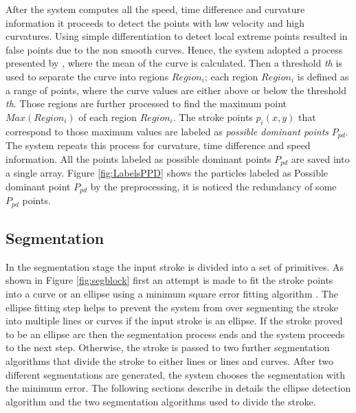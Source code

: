 \documentclass[10pt]{article}
\begin{document}
After the system computes all the speed, time difference and curvature information it proceeds to detect the points with low velocity and high curvatures. Using simple differentiation to detect local extreme points resulted in false points due to the non smooth curves. Hence, the system adopted a process presented by \cite{earlyprocess}, where the mean of the curve is calculated. Then a threshold \textit{th} is used to separate the curve into regions $Region_i$; each region $Region_i$ is defined as a range of points, where the curve values are either above or below the threshold \textit{th}. Those regions are further processed to find the maximum point $Max(Region_i)$ of each region $Region_i$. The stroke points $p_i(x,y)$ that correspond to those maximum values are labeled as \textit{possible dominant points} $P_{pd}$. The system repeats this process for curvature, time difference and speed information. All the points labeled as possible dominant points $P_{pd}$ are saved into a single array. Figure \ref{fig:LabelsPPD} shows the particles labeled as Possible dominant point $P_{pd}$ by the preprocessing, it is noticed the redundancy of some $P_{pd}$ points. %
\subsection{Segmentation}
\label{seg}
In the segmentation stage the input stroke is divided into a set of primitives. As shown in Figure \ref{fig:segblock} first an attempt is made to fit the stroke points into a curve or an ellipse using a minimum square error fitting algorithm \cite{ellipsefit}. The ellipse fitting step helps to prevent the system from over segmenting the stroke into multiple lines or curves if the input stroke is an ellipse. If the stroke proved to be an ellipse arc then the segmentation process ends and the system proceeds to the next step. Otherwise, the stroke is passed to two further segmentation algorithms that divide the stroke to either lines or lines and curves. After two different segmentations are generated, the system chooses the segmentation with the minimum error. The following sections describe in details the ellipse detection algorithm and the two segmentation algorithms used to divide the stroke. %
\end{document}
